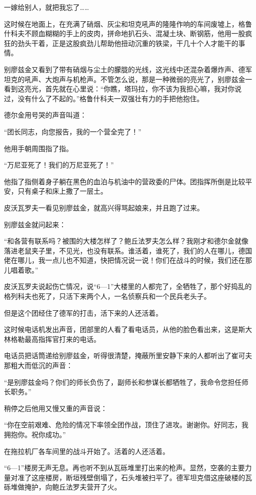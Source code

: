 一嫁给别人，就把我忘了……

这时候在地面上，在充满了硝烟、灰尘和坦克吼声的隆隆作响的车间废墟上，格鲁什科夫不顾血糊糊的手上的皮肉，拼命地扒石头、混凝土块、断钢筋，他用一股疯狂的劲头干着，正是这股疯劲儿帮助他扭动沉重的铁梁，干几十个人才能干的事情。

别廖兹金又看到了带有硝烟与尘土的朦胧的光线，这光线中还混杂着爆炸声、德军坦克的吼声、大炮声与机枪声。不管怎么说，那是一种微弱的亮光了，别廖兹金一看到这亮光，首先就在心里说：“你瞧，塔玛拉，你不该为我担心嘛，我对你说过，没有什么了不起的。”格鲁什科夫一双强壮有力的手把他抱住。

德尔金用号哭的声音叫道：

“团长同志，向您报告，我的一个营全完了！”

他用手朝周围指了指。

“万尼亚死了！我们的万尼亚死了！”

他指了指侧着身子躺在黑色的血泊与机油中的营政委的尸体。团指挥所倒是比较平安，只有桌子和床上撒了一层土。

皮沃瓦罗夫一看见别廖兹金，就高兴得骂起娘来，并且跑了过来。

别廖兹金就问起来：

“和各营有联系吗？被围的大楼怎样了？鲍丘法罗夫怎么样？我刚才和德尔金就像落进老鼠夹子里，不见光，也没有联系。谁活着，谁死了，我们的人在哪儿，德国佬在哪儿，我一点儿也不知道，快把情况说一说！你们在战斗的时候，我们还在那儿唱着歌。”

皮沃瓦罗夫说起伤亡情况，说“6—1”大楼里的人都完了，全牺牲了，那个好捣乱的格列科夫也死了，只活下来两个人，一名侦察兵和一个民兵老头子。

但是这个团经住了德军的打击，活下来的人还活着。

这时候电话机发出声音，团部里的人看了看电话员，从他的脸色看出来，这是斯大林格勒最高指挥官打来的电话。

电话员把话筒递给别廖兹金，听得很清楚，掩蔽所里安静下来的人都听出了崔可夫那粗大而低沉的声音：

“是别廖兹金吗？你们的师长负伤了，副师长和参谋长都牺牲了，我命令您担任师长职务。”

稍停之后他用又慢又重的声音说：

“你在空前艰难、危险的情况下率领全团作战，顶住了进攻。谢谢你。好同志，我拥抱你。祝你成功。”

在拖拉机厂各车间里的战斗开始了。活着的人还活着。

“6—1”楼房无声无息。再也听不到从瓦砾堆里打出来的枪声。显然，空袭的主要力量对准了这座楼房，断垣残壁倒塌了，石头堆被扫平了。德军坦克借这座破楼的瓦砾堆做掩护，向鲍丘法罗夫营开了火。

